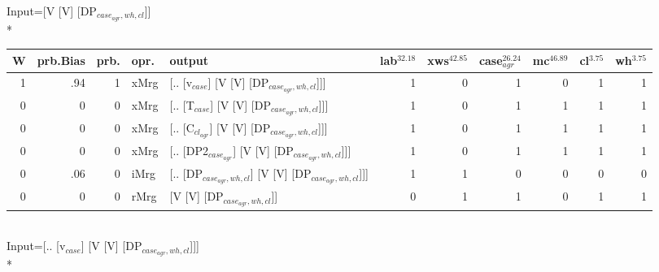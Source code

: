 \begingroup\scriptsize Input=[V [V] [DP$_{case_{agr},wh,cl}$]]\\*
\begin{tabularx}{\linewidth}{rrrlXrrrrrr}
\hline
   W &   prb.Bias &   prb. & opr.   & output                                               &   lab$^{32.18}$ &   xws$^{42.85}$ &   case$_{agr}^{26.24}$ &   mc$^{46.89}$ &   cl$^{3.75}$ &   wh$^{3.75}$ \\
\hline
   1 &       .94 &   1 & xMrg & [.. [v$_{case}$] [V [V] [DP$_{case_{agr},wh,cl}$]]]            &             1 &             0 &                  1 &            0 &        1 &        1 \\
   0 &       0 &   0 & xMrg & [.. [T$_{case}$] [V [V] [DP$_{case_{agr},wh,cl}$]]]            &             1 &             0 &                  1 &            1 &        1 &        1 \\
   0 &       0 &   0 & xMrg & [.. [C$_{cl_{agr}}$] [V [V] [DP$_{case_{agr},wh,cl}$]]]          &             1 &             0 &                  1 &            1 &        1 &        1 \\
   0 &       0 &   0 & xMrg & [.. [DP2$_{case_{agr}}$] [V [V] [DP$_{case_{agr},wh,cl}$]]]      &             1 &             0 &                  1 &            1 &        1 &        1 \\
   0 &       .06 &   0 & iMrg & [.. [DP$_{case_{agr},wh,cl}$] [V [V] [DP$_{case_{agr},wh,cl}$]]] &             1 &             1 &                  0 &            0 &        0 &        0 \\
   0 &       0 &   0 & rMrg & [V [V] [DP$_{case_{agr},wh,cl}$]]                          &             0 &             1 &                  1 &            0 &        1 &        1 \\
\hline
\end{tabularx}\endgroup\\
\begingroup\scriptsize Input=[.. [v$_{case}$] [V [V] [DP$_{case_{agr},wh,cl}$]]]\\*
